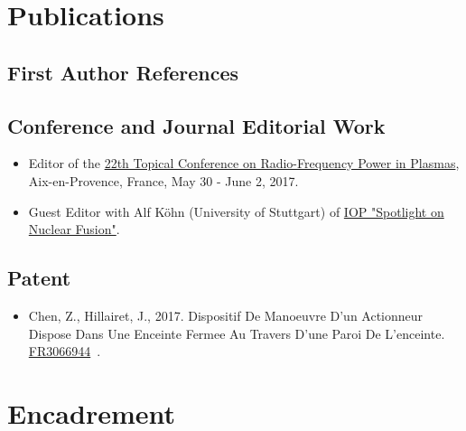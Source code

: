 \documentclass[
fontsize=10pt, %
twoside=true, %
numbers=noenddot, %
]{kaobook}
\begin{document}
	\newpage
	\chapter{Publications}
	\begin{refsection}
		\section*{First Author References}
		\nocite{*}
		\printbibliography[heading=none]
	\end{refsection}

	\section*{Conference and Journal Editorial Work}
	\begin{itemize}
		\item Editor of the \href{https://www.epj-conferences.org/articles/epjconf/abs/2017/26/contents/contents.html}{22th Topical Conference on Radio-Frequency Power in Plasmas}, Aix-en-Provence, France, May 30 - June 2, 2017.
		\item Guest Editor with Alf Köhn (University of Stuttgart) of \href{https://iopscience.iop.org/journal/0031-9120/page/Spotlight-on-Nuclear-Fusion}{IOP "Spotlight on Nuclear Fusion"}.
	\end{itemize}
	
	\section*{Patent}

	\begin{itemize}
		\item Chen, Z., Hillairet, J., 2017. Dispositif De Manoeuvre D’un Actionneur Dispose Dans Une Enceinte Fermee Au Travers D’une Paroi De L’enceinte. \href{https://bases-brevets.inpi.fr/fr/document/FR3066944.html?s=1587045453863&p=5&cHash=9dd74066794d8b15bf32b0ef194d0d86}{FR3066944}~\cite{chen2017-4}.
	\end{itemize}
		
	
	\newpage
	\chapter{Encadrement}
\end{document}
